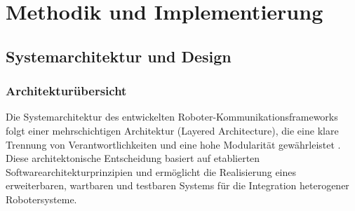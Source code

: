 \chapter{Methodik und Implementierung}
\label{cap:Framework}


\section{Systemarchitektur und Design}

\subsection{Architekturübersicht}
\label{sec:architektur_uebersicht}

Die Systemarchitektur des entwickelten Roboter-Kommunikationsframeworks folgt
einer mehrschichtigen Architektur (Layered Architecture), die eine klare
Trennung von Verantwortlichkeiten und eine hohe Modularität gewährleistet
\cite{Bass2012, Fowler2002}. Diese architektonische Entscheidung basiert auf
etablierten Softwarearchitekturprinzipien und ermöglicht die Realisierung eines
erweiterbaren, wartbaren und testbaren Systems für die Integration heterogener
Robotersysteme.

